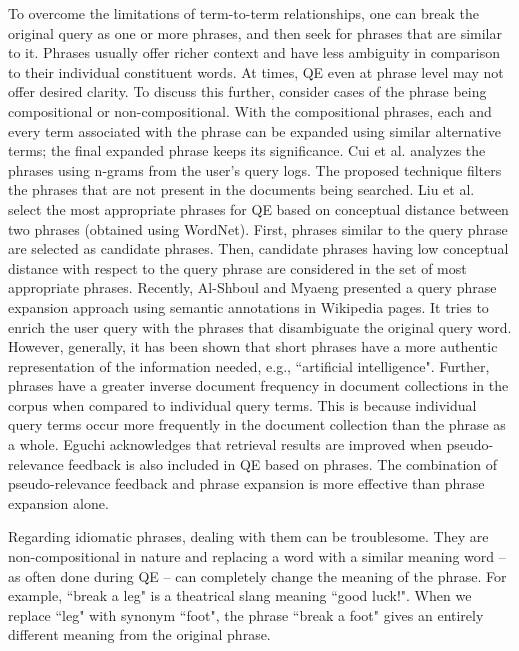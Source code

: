 To overcome the limitations of term-to-term relationships, one can break the original query as one or more phrases, and then seek for phrases that are similar to it. Phrases usually offer richer context and have less ambiguity in comparison to their individual constituent words. At times, QE even at phrase level may not offer desired clarity. To discuss this further, consider cases of the phrase being compositional or non-compositional. With the compositional phrases, each and every term associated with the phrase can be expanded using similar alternative terms; the final expanded phrase keeps its significance. Cui et al. \cite{cui2003query} analyzes the phrases using n-grams from the user's query logs. The proposed technique filters the phrases that are not present in the documents being searched. Liu et al. \cite{liu2008query} select the most appropriate phrases for QE based on conceptual distance between two phrases (obtained using WordNet). First, phrases similar to the query phrase are selected as candidate phrases. Then, candidate phrases having low conceptual distance with respect to the query phrase are considered in the set of most appropriate phrases. Recently, Al-Shboul and Myaeng \cite{al2014wikipedia} presented a query phrase expansion approach using semantic annotations in Wikipedia pages. It tries to enrich the user query with the phrases that disambiguate the original query word. However, generally, it has been shown that short phrases have a more authentic representation of the information needed, e.g.,  ``artificial intelligence". Further, phrases have a greater inverse document frequency in document collections in the corpus when compared to individual query terms. This is because individual query terms occur more frequently in the document collection than the phrase as a whole. Eguchi \cite{eguchi2005ntcir} acknowledges that retrieval results are improved when pseudo-relevance feedback is also included in QE based on phrases. The combination of pseudo-relevance feedback and phrase expansion is more effective than phrase expansion alone. 

Regarding idiomatic phrases, dealing with them can be troublesome. They are non-compositional in nature and replacing a word with a similar meaning word -- as often done during QE -- can completely change the meaning of the phrase. For example, ``break a leg" is a theatrical slang meaning ``good luck!".  When we replace ``leg" with synonym ``foot", the phrase ``break a foot" gives an  entirely different meaning from the original phrase.

